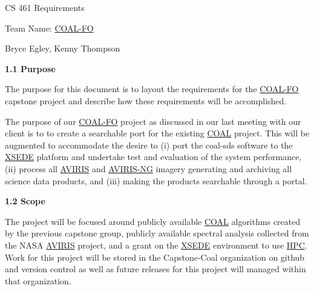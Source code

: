 \documentclass[a4paper,12pt]{article}
\begin{document}
\sloppy

\noindent CS 461 Requirements\newline


\noindent Team Name: \href{http://eecs.oregonstate.edu/capstone/submission/?page=preview\&pid=320}{COAL-FO}\newline


\noindent Bryce Egley, Kenny Thompson\newline


\newline


\noindent \textbf{1.1 Purpose}\newline


\noindent The purpose for this document is to layout the requirements for the \href{http://eecs.oregonstate.edu/capstone/submission/?page=preview\&pid=320}{COAL-FO} capstone project and describe how these requirements will be accomplished. \newline

\noindent The purpose of our \href{http://eecs.oregonstate.edu/capstone/submission/?page=preview\&pid=320}{COAL-FO} project as discussed in our last meeting with our client is to to create a searchable port for the existing \href{https://capstone-coal.github.io/}{COAL} project. This will be augmented to accommodate the desire to (i) port the coal-sds software to the \href{https://www.xsede.org/}{XSEDE} platform and undertake test and evaluation of the system performance, (ii) process all \href{https://aviris.jpl.nasa.gov/}{AVIRIS} and \href{https://aviris-ng.jpl.nasa.gov/}{AVIRIS-NG} imagery generating and archiving all science data products, and (iii) making the products searchable through a portal. \newline

\noindent \textbf{1.2 Scope}\newline


\noindent The project will be focused around publicly available \href{https://capstone-coal.github.io/}{COAL} algorithms created by the previous capstone group, publicly available spectral analysis collected from the NASA \href{https://aviris.jpl.nasa.gov/}{AVIRIS} project, and a grant on the \href{https://www.xsede.org/}{XSEDE} environment to use \href{https://en.wikipedia.org/wiki/Supercomputer}{HPC}. Work for this project will be stored in the Capstone-Coal organization on github and version control as well as future releases for this project will managed within that organization.\newline
\end{document}
